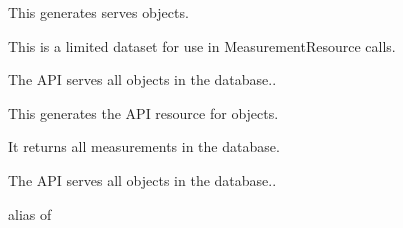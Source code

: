 \documentclass[letterpaper,10pt,english]{sphinxmanual}
\begin{document}

\begin{fulllineitems}
\label{data:mousedb.data.api.MeasurementAssayResource}
This generates serves {\hyperref[data:mousedb.data.models.Assay]{}} objects.

This is a limited dataset for use in MeasurementResource calls.

\begin{fulllineitems}
\label{data:mousedb.data.api.MeasurementAssayResource.Meta}
The API serves all {\hyperref[data:mousedb.data.models.Assay]{}} objects in the database..

\end{fulllineitems}


\end{fulllineitems}


\begin{fulllineitems}
\label{data:mousedb.data.api.MeasurementResource}
This generates the API resource for {\hyperref[data:mousedb.data.models.Measurement]{}} objects.

It returns all measurements in the database.

\begin{fulllineitems}
\label{data:mousedb.data.api.MeasurementResource.Meta}
The API serves all {\hyperref[data:mousedb.data.models.Measurement]{}} objects in the database..

\begin{fulllineitems}
\label{data:mousedb.data.api.MeasurementResource.Meta.object_class}
alias of 

\end{fulllineitems}


\end{fulllineitems}


\end{fulllineitems}
\end{document}
